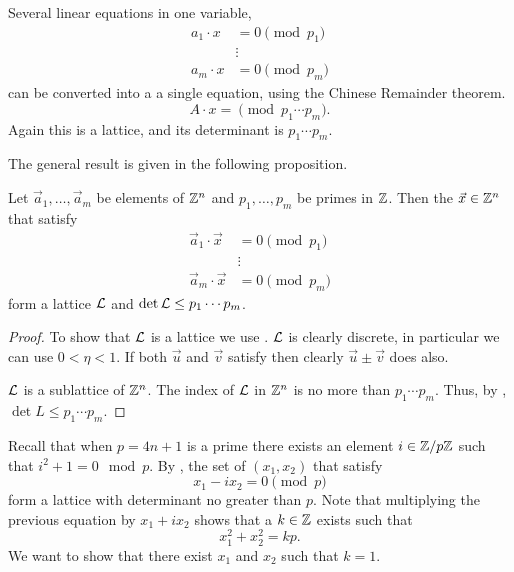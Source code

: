 Several linear equations in one variable,
\[
\begin {aligned}
a_1 \cdot x & = 0 \pmod{p_1} \\
 & \vdots \\
a_m \cdot x & = 0 \pmod{p_m} 
\end{aligned}
\]
can be converted into a a single equation, using the Chinese Remainder
theorem.
\[
A \cdot x = \pmod{p_1 \cdots p_m}.
\]
Again this is a lattice, and its determinant is $p_1 \cdots p_m$.

The general result is given in the following proposition. 

\begin{proposition} \label{FF:Lattice:Prop}
Let $\vec{a}_1, \ldots, \vec{a}_m$ be elements of $\mathbb{Z}^n$ and $p_1, \ldots,
p_m$ be primes in $\mathbb{Z}$.  Then the $\vec{x} \in \mathbb{Z}^n$ that satisfy
\begin{equation} \label{Lat:Modular:Eq}
  \begin {aligned}
    \vec{a}_1 \cdot \vec{x} & = 0 \pmod{p_1} \\
       & \vdots \\
    \vec{a}_m \cdot \vec{x} & = 0 \pmod{p_m} 
\end{aligned}
\end{equation}
form a lattice ${\cal L}$ and $\det {\cal L} \le p_1 \cdots p_m$.
\end{proposition}

\begin{proof}
To show that ${\cal L}$ is a lattice we use
.  ${\cal L}$ is clearly discrete,
in particular 
we can use $0 < \eta < 1$.  If both $\vec{u}$ and $\vec{v}$ satisfy
 then clearly $\vec{u} \pm \vec{v}$ does also.

${\cal L}$ is a sublattice of $\mathbb{Z}^n$.  The index of ${\cal L}$ in
$\mathbb{Z}^n$ is no more  than $p_1 \cdots p_m$.  Thus, by
, $\det L \le p_1 \cdots p_m$.
\end{proof}

Recall that when $p = 4n+1$ is a prime there exists an element $i
\in \mathbb{Z}/p\mathbb{Z}$ such that $i^2+1 = 0 \mod{p}$.  By ,
the set of $(x_1, x_2)$ that satisfy
\[
x_1 - i x_2 = 0 \pmod{p}
\]
form a lattice with determinant no greater than $p$.  Note that
multiplying the previous equation by $x_1 + i x_2$ shows that a $k \in
\mathbb{Z}$ exists such that
\[
x_1^2 + x_2^2 = kp.
\]
We want to show that there exist $x_1$ and $x_2$ such that $k = 1$.

